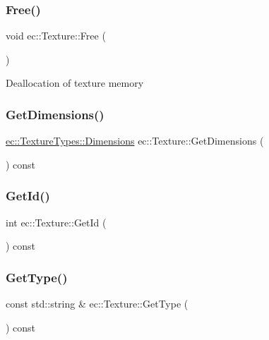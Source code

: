 \subsubsection{\texorpdfstring{Free()}{Free()}}
{\footnotesize\ttfamily void ec\+::\+Texture\+::\+Free (\begin{DoxyParamCaption}{ }\end{DoxyParamCaption})}

Deallocation of texture memory \mbox{\label{classec_1_1_texture_a774a1f7dfefd55b01e7f645ba3b23660}} 
\subsubsection{\texorpdfstring{Get\+Dimensions()}{GetDimensions()}}
{\footnotesize\ttfamily \mbox{\hyperlink{structec_1_1_texture_types_aa9ef510185cfe61d20918eb0b2c13501}{ec\+::\+Texture\+Types\+::\+Dimensions}} ec\+::\+Texture\+::\+Get\+Dimensions (\begin{DoxyParamCaption}{ }\end{DoxyParamCaption}) const}

\mbox{\label{classec_1_1_texture_af3ba0bce713e3c54ec5a12c830a99940}} 
\subsubsection{\texorpdfstring{Get\+Id()}{GetId()}}
{\footnotesize\ttfamily int ec\+::\+Texture\+::\+Get\+Id (\begin{DoxyParamCaption}{ }\end{DoxyParamCaption}) const}

\mbox{\label{classec_1_1_texture_a5062d684caa000641817a918451eb76a}} 
\subsubsection{\texorpdfstring{Get\+Type()}{GetType()}}
{\footnotesize\ttfamily const std\+::string \& ec\+::\+Texture\+::\+Get\+Type (\begin{DoxyParamCaption}{ }\end{DoxyParamCaption}) const}

